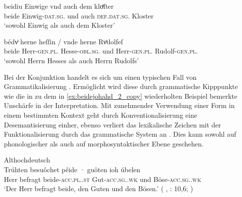\begin{exe}
\ex \label{ex:caoconjbeide}
	\begin{xlist}
	\ex \label{ex:caoconjbeide_1}
		\gll beidiu Einwige vnd auch dem kloͤſter \\
				beide Einwig-\textsc{dat.sg.\FemF} und auch
				\textsc{def.dat.sg.\NeutM} Kloster \\
		\trans `sowohl Einwig als auch dem Kloster'
			\parencites(Nr.~2925, Landshut, 1298)[219,34]{cao4}

	\ex \label{ex:caoconjbeide_2}
		\gll bédvͥ herne heſſin / vnde herne Rvͦdolfeſ \\
			beide Herr-\textsc{gen.pl.\MascM} Hesse-\textsc{obl.sg.\MascM} {}
				und Herr-\textsc{gen.pl.\MascM} Rudolf-\textsc{gen.pl.\MascM}
				\\
		\trans `sowohl Herrn Hesses als auch Herrn Rudolfs'
			\parencites(Nr.~1318, Freiburg i.\,Br., 1290)[561,11--12]{cao2}
	\end{xlist}
\end{exe}

Bei der Konjunktion  handelt es sich um einen typischen Fall von
Grammatikalisierung \autocite[vgl.][134--188]{lehmann2015}. Ermöglicht wird
diese durch grammatische Kipppunkte wie die in  zu dem
in \cref{ex:beidejohahd_2_copy} wiederholten Beispiel bemerkte Unschärfe in der
Interpretation. Mit zunehmender Verwendung einer Form in einem bestimmten
Kontext geht durch Konventionalisierung eine Desemantisierung einher, ebenso
verliert das lexikalische Zeichen mit der Funktionalisierung durch das
grammatische System an . Dies kann sowohl auf phonologischer als
auch auf morphosyntaktischer Ebene geschehen.

\begin{exe}
\ex \label{ex:beidejohahd_2_copy}
	Althochdeutsch\\
	\gll Trúhten besuôchet pêide · guôten ioh úbelen \\
			Herr befragt beide-\textsc{acc.pl.\MascA.st} {}
				Gut-\textsc{acc.sg.\MascA.wk} und
				Böse-\textsc{acc.sg.\MascA.wk} \\
		\trans `Der Herr befragt beide, den Guten und den Bösen.'
			(%
				, : 10,6;
				\cite[35]{tax1979}%
			)
\end{exe}


